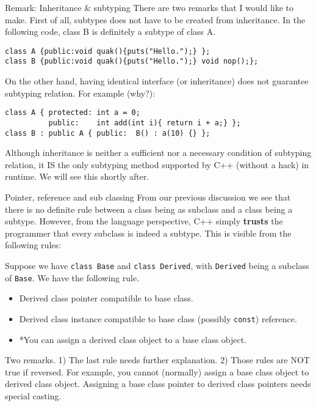 \begin{frame}[fragile]{Remark: Inheritance \& subtyping}
There are two remarks that I would like to make. First of all, subtypes does not have to be created from inheritance. In the following code, class B is definitely a subtype of class A.

\begin{verbatim}
class A {public:void quak(){puts("Hello.");} };
class B {public:void quak(){puts("Hello.");} void nop();};
\end{verbatim}

On the other hand, having identical interface (or inheritance) does not guarantee subtyping relation. For example (why?):

\begin{verbatim}
class A { protected: int a = 0; 
          public:    int add(int i){ return i + a;} };
class B : public A { public:  B() : a(10) {} };
\end{verbatim}

Although inheritance is neither a sufficient nor a necessary condition of subtyping relation, it IS the only subtyping method supported by C++ (without a hack) in runtime. We will see this shortly after. 
\end{frame}

\begin{frame}[fragile]{Pointer, reference and sub classing}
From our previous discussion we see that there is no definite rule between a class being as subclass and a class being a subtype. However, from the language perspective, C++ simply \textbf{trusts} the programmer that every subclass is indeed a subtype. This is visible from the following rules:

Suppose we have \texttt{class Base} and \texttt{class Derived}, with \texttt{Derived} being a subclass of \texttt{Base}. We have the following rule.

\begin{itemize}
	\item Derived class pointer compatible to base class. 
	\item Derived class instance compatible to base class (possibly \texttt{const}) reference.
	\item *You can assign a derived class object to a base class object.
\end{itemize}

Two remarks. 1) The last rule needs further explanation. 2) Those rules are NOT true if reversed. For example, you cannot (normally) assign a base class object to derived class object. Assigning a base class pointer to derived class pointers needs special casting. 

\end{frame}

